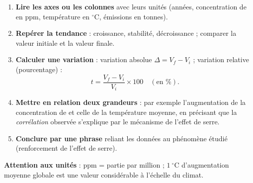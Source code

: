 \documentclass[11pt]{article}
\begin{document}
\begin{methode}
\begin{enumerate}
\item \textbf{Lire les axes ou les colonnes} avec leurs unités (années, concentration de  en ppm, température en $^\circ\mathrm{C}$, émissions en tonnes).
\item \textbf{Repérer la tendance} : croissance, stabilité, décroissance ; comparer la valeur initiale et la valeur finale.
\item \textbf{Calculer une variation} : variation absolue $\Delta = V_f - V_i$ ; variation relative (pourcentage) :
\[ t = \frac{V_f - V_i}{V_i} \times 100 \quad (\text{en } \%). \]
\item \textbf{Mettre en relation deux grandeurs} : par exemple l'augmentation de la concentration de  et celle de la température moyenne, en précisant que la \emph{corrélation} observée s'explique par le mécanisme de l'effet de serre.
\item \textbf{Conclure par une phrase} reliant les données au phénomène étudié (renforcement de l'effet de serre).
\end{enumerate}
\textbf{Attention aux unités} : ppm = partie par million ; $1\ ^\circ\mathrm{C}$ d'augmentation moyenne globale est une valeur considérable à l'échelle du climat.
\end{methode}
\end{document}
